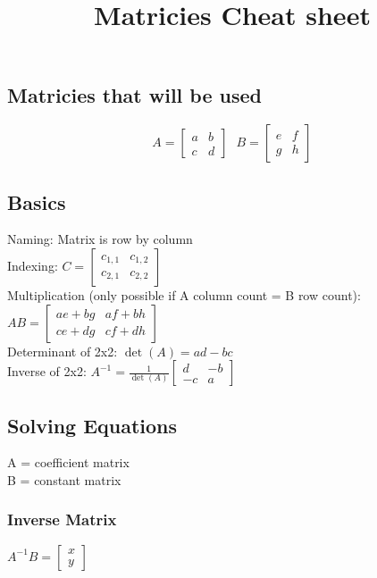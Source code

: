 \documentclass{article}
\title{\vspace{-5ex}Matricies Cheat sheet  \vspace{-5ex}}
\author{}
\date{}
\begin{document}
	\maketitle{}

	\subsection*{Matricies that will be used}
	\begin{equation*}
		A = 
		\begin{bmatrix}
			a & b \\
			c & d
		\end{bmatrix}
		\text{ }
		B = 
		\begin{bmatrix}
			e & f \\
			g & h
		\end{bmatrix}
	\end{equation*}

	\subsection*{Basics}
	Naming: Matrix is row by column \\
	Indexing: $C = \begin{bmatrix}
			c_{1, 1} & c_{1, 2} \\
			c_{2, 1} & c_{2, 2}
		\end{bmatrix}$ \\
	Multiplication (only possible if A column count = B row count): $AB = 		\begin{bmatrix}
		ae+bg & af+bh \\
		ce+dg & cf+dh
	\end{bmatrix}$ \\
	Determinant of 2x2: $\det(A) = ad-bc$ \\
	Inverse of 2x2: $A^{-1} = \frac{1}{\det(A)} \begin{bmatrix}
		d & -b \\
		-c & a
	\end{bmatrix}$

	\subsection*{Solving Equations}
	A = coefficient matrix \\
	B = constant matrix
	\subsubsection*{Inverse Matrix}
	$A^{-1}B= \begin{bmatrix}
		x \\
		y
	\end{bmatrix}$
\end{document}
